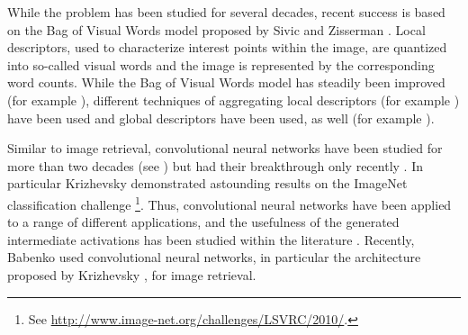 While the problem has been studied for several decades, recent success is based on the Bag of Visual Words model proposed by Sivic and Zisserman \cite{SivicZisserman:2003}. Local descriptors, used to characterize interest points within the image, are quantized into so-called visual words and the image is represented by the corresponding word counts. While the Bag of Visual Words model has steadily been improved (for example \cite{ChumPhilbinSivicIsardZisserman:2007,PhilbinChumIsardSivicZisserman:2007,ArandjelovicZisserman:2012}), different techniques of aggregating local descriptors (for example \cite{JegouDouzeSchmidPerez:2010,GeKeSun:2013,JegouZisserman:2014,PhilbinIsardSivicZisserman:2010}) have been used and global descriptors have been used, as well (for example \cite{OlivaTorralba:2001}).

Similar to image retrieval, convolutional neural networks \cite{LeCunBoserDenkerhendersonHowardHubbardJackel:1989} have been studied for more than two decades (see \cite{Bengio:2009,LeCunBoserDenkerhendersonHowardHubbardJackel:1989}) but had their breakthrough only recently \cite{Bengio:2009}.
In particular Krizhevsky \etal \cite{KrizhevskySutskeverHinton:2012} demonstrated astounding results on the ImageNet classification challenge
\footnote{
    See \url{http://www.image-net.org/challenges/LSVRC/2010/}.
}.
Thus, convolutional neural networks have been applied to a range of different applications, and the usefulness of the generated intermediate activations has been studied within the literature \cite{Bengio:2009}. Recently, Babenko \etal \cite{BabenkoSlesarevChigorinLempitsky:2014} used convolutional neural networks, in particular the architecture proposed by Krizhevsky \etal, for image retrieval.


